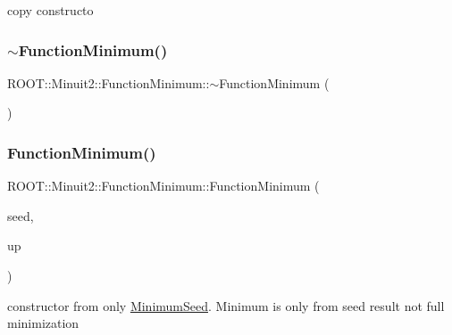 copy constructo 

\mbox{\label{classROOT_1_1Minuit2_1_1FunctionMinimum_aaaef452fc02a74a63a9390329ed1dd04}} 
\subsubsection{\texorpdfstring{$\sim$FunctionMinimum()}{~FunctionMinimum()}\hspace{0.1cm}{\footnotesize\ttfamily [2/3]}}
{\footnotesize\ttfamily R\+O\+O\+T\+::\+Minuit2\+::\+Function\+Minimum\+::$\sim$\+Function\+Minimum (\begin{DoxyParamCaption}{ }\end{DoxyParamCaption})\hspace{0.3cm}{\ttfamily [inline]}}

\mbox{\label{classROOT_1_1Minuit2_1_1FunctionMinimum_a907871106f0be755404d80f32fbe2041}} 
\subsubsection{\texorpdfstring{FunctionMinimum()}{FunctionMinimum()}\hspace{0.1cm}{\footnotesize\ttfamily [11/15]}}
{\footnotesize\ttfamily R\+O\+O\+T\+::\+Minuit2\+::\+Function\+Minimum\+::\+Function\+Minimum (\begin{DoxyParamCaption}\item[{const \mbox{\hyperlink{classROOT_1_1Minuit2_1_1MinimumSeed}{Minimum\+Seed}} \&}]{seed,  }\item[{double}]{up }\end{DoxyParamCaption})\hspace{0.3cm}{\ttfamily [inline]}}



constructor from only \mbox{\hyperlink{classROOT_1_1Minuit2_1_1MinimumSeed}{Minimum\+Seed}}. Minimum is only from seed result not full minimization 

